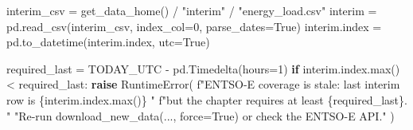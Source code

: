 \documentclass[
  english,
  letterpaper,
]{scrbook}
\newenvironment{Shaded}{\begin{snugshade}}{\end{snugshade}}
\newcommand{\BuiltInTok}[1]{\textcolor[rgb]{0.00,0.23,0.31}{#1}}
\newcommand{\ControlFlowTok}[1]{\textcolor[rgb]{0.00,0.23,0.31}{\textbf{#1}}}
\newcommand{\DecValTok}[1]{\textcolor[rgb]{0.68,0.00,0.00}{#1}}
\newcommand{\NormalTok}[1]{\textcolor[rgb]{0.00,0.23,0.31}{#1}}
\newcommand{\OperatorTok}[1]{\textcolor[rgb]{0.37,0.37,0.37}{#1}}
\newcommand{\PreprocessorTok}[1]{\textcolor[rgb]{0.68,0.00,0.00}{#1}}
\newcommand{\SpecialCharTok}[1]{\textcolor[rgb]{0.37,0.37,0.37}{#1}}
\newcommand{\SpecialStringTok}[1]{\textcolor[rgb]{0.13,0.47,0.30}{#1}}
\newcommand{\StringTok}[1]{\textcolor[rgb]{0.13,0.47,0.30}{#1}}
\newcommand{\VariableTok}[1]{\textcolor[rgb]{0.07,0.07,0.07}{#1}}
\begin{document}
\begin{Shaded}
\begin{Highlighting}[]
\NormalTok{interim\_csv }\OperatorTok{=}\NormalTok{ get\_data\_home() }\OperatorTok{/} \StringTok{"interim"} \OperatorTok{/} \StringTok{"energy\_load.csv"}
\NormalTok{interim }\OperatorTok{=}\NormalTok{ pd.read\_csv(interim\_csv, index\_col}\OperatorTok{=}\DecValTok{0}\NormalTok{, parse\_dates}\OperatorTok{=}\VariableTok{True}\NormalTok{)}
\NormalTok{interim.index }\OperatorTok{=}\NormalTok{ pd.to\_datetime(interim.index, utc}\OperatorTok{=}\VariableTok{True}\NormalTok{)}

\NormalTok{required\_last }\OperatorTok{=}\NormalTok{ TODAY\_UTC }\OperatorTok{{-}}\NormalTok{ pd.Timedelta(hours}\OperatorTok{=}\DecValTok{1}\NormalTok{)}
\ControlFlowTok{if}\NormalTok{ interim.index.}\BuiltInTok{max}\NormalTok{() }\OperatorTok{\textless{}}\NormalTok{ required\_last:}
    \ControlFlowTok{raise} \PreprocessorTok{RuntimeError}\NormalTok{(}
        \SpecialStringTok{f"ENTSO{-}E coverage is stale: last interim row is }\SpecialCharTok{\{}\NormalTok{interim}\SpecialCharTok{.}\NormalTok{index}\SpecialCharTok{.}\BuiltInTok{max}\NormalTok{()}\SpecialCharTok{\}}\SpecialStringTok{ "}
        \SpecialStringTok{f"but the chapter requires at least }\SpecialCharTok{\{}\NormalTok{required\_last}\SpecialCharTok{\}}\SpecialStringTok{. "}
        \StringTok{"Re{-}run download\_new\_data(..., force=True) or check the ENTSO{-}E API."}
\NormalTok{    )}


\end{Highlighting}
\end{Shaded}
\end{document}
